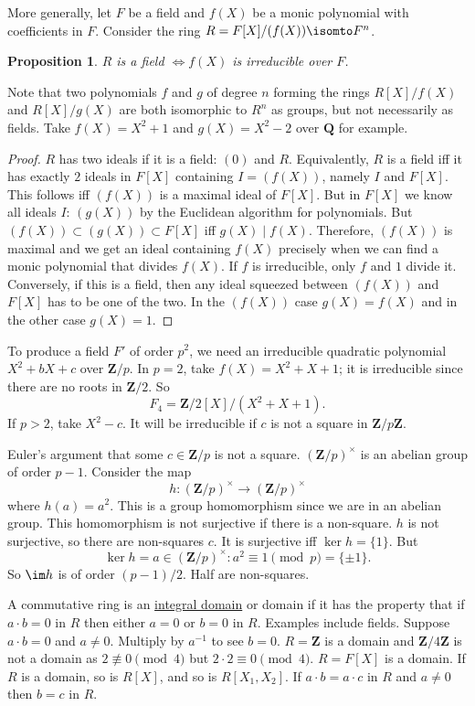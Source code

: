 \documentclass[11pt, oneside]{amsart}
\numberwithin{equation}{section}
\numberwithin{theorem}{section}
\newtheorem{proposition}[theorem]{Proposition}
\theoremstyle{definition}
\def\Z{\mathbf{Z}}
\def\Q{\mathbf{Q}}
\begin{document}
{More generally, let $F$ be a field and $f(X) $ be a monic polynomial with coefficients in $F$. Consider the ring $R = F[X]/(f(X))\isomto F^n$. 
\begin{proposition}
$R$ is a field $\iff f(X)$ is irreducible over $F$.
\end{proposition}
Note that two polynomials $f$ and $g$ of degree $n$ forming the rings $R[X]/f(X)$ and $R[X]/g(X)$ are both isomorphic to $R^n$ as groups, but not necessarily as fields. Take $f(X) = X^2+1$ and $g(X) = X^2 -2$ over $\Q$ for example.
\begin{proof}
$R$ has two ideals if it is a field: $(0)$ and $R$. Equivalently, $R$ is a field iff it has exactly $2$ ideals in $F[X]$ containing $I = (f(X))$, namely $I$ and $F[X]$. This follows iff $(f(X))$ is a maximal ideal of $F[X]$. But in $F[X]$ we know all ideals $I$: $(g(X))$ by the Euclidean algorithm for polynomials. But $(f(X))\subset(g(X))\subset F[X]$ iff $g(X) \mid f(X)$. Therefore, $(f(X))$ is maximal and we get an ideal containing $f(X)$ precisely when we can find a monic polynomial that divides $f(X)$. If $f$ is irreducible, only $f$ and $1$ divide it. Conversely, if this is a field, then any ideal squeezed between $(f(X))$ and $F[X]$ has to be one of the two. In the $(f(X))$ case $g(X) = f(X)$ and in the other case $g(X) = 1$.
\end{proof}

To produce a field $F'$ of order $p^2$, we need an irreducible quadratic polynomial $X^2+bX +c$ over $\Z/p$. In $p=2$, take $f(X) = X^2+X+1$; it is irreducible since there are no roots in $\Z/2$. So 
$$
F_4 = \Z/2[X]/(X^2+X+1).
$$
If $p>2$, take $X^2 -c$. It will be irreducible if $c$ is not a square in $\Z/p\Z$. 

Euler's argument that some $c\in\Z/p$ is not a square. $(\Z/p)^\times$ is an abelian group of order $p-1$. Consider the map
$$ 
h : (\Z/p)^\times \to (\Z/p)^\times
$$
where $h(a) = a^2$. This is a group homomorphism since we are in an abelian group. This homomorphism is not surjective if there is a non-square. $h$ is not surjective, so there are non-squares $c$. It is surjective iff $\ker h = \{1\}$. But 
$$
\ker h = a \in (\Z/p)^\times : a^2 \equiv 1\pmod p = \{\pm 1\}.
$$ 
So $\im h$ is of order $(p-1)/2$. Half are non-squares. 

A commutative ring is an \underline{integral domain} or domain if it has the property that if $a\cdot b = 0$ in $R$ then either $a=0$ or $b=0$ in $R$. Examples include fields. Suppose $a\cdot b=0$ and $a\neq 0$. Multiply by $a^{-1}$ to see $b=0$. $R=\Z$ is a domain and $\Z/4\Z$ is not a domain as $2\not\equiv 0\pmod 4$ but $2\cdot 2\equiv 0\pmod 4$. $R=F[X]$ is a domain. If $R$ is a domain, so is $R[X]$, and so is $R[X_1,X_2]$. If $a\cdot b= a\cdot c$ in $R$ and $a\neq 0$ then $b=c$ in $R$. 

}
\end{document}
